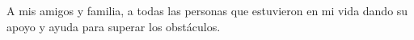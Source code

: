 \begin{dedication}
A mis amigos y familia, a todas las personas que estuvieron en mi vida dando su apoyo y ayuda para superar los obstáculos.
\end{dedication}